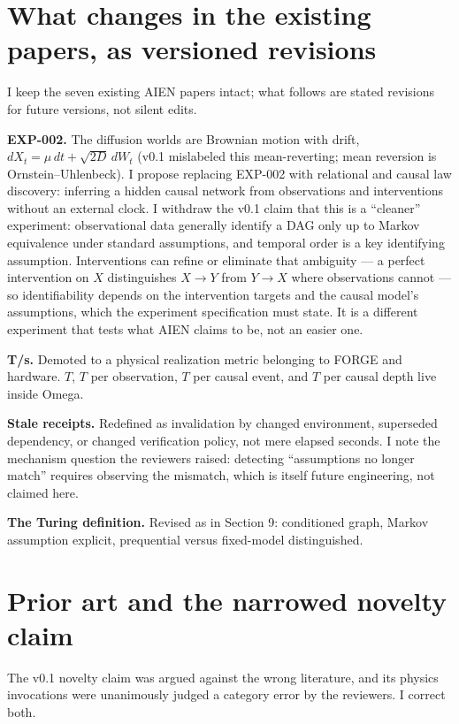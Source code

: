 \documentclass[11pt]{article}
\begin{document}
\section{What changes in the existing papers, as versioned revisions}

I keep the seven existing AIEN papers intact; what follows are stated revisions for future versions, not silent edits.

\textbf{EXP-002.} The diffusion worlds are Brownian motion with drift, $dX_t = \mu\,dt + \sqrt{2D}\,dW_t$ (v0.1 mislabeled this mean-reverting; mean reversion is Ornstein--Uhlenbeck). I propose replacing EXP-002 with relational and causal law discovery: inferring a hidden causal network from observations and interventions without an external clock. I withdraw the v0.1 claim that this is a ``cleaner'' experiment: observational data generally identify a DAG only up to Markov equivalence under standard assumptions, and temporal order is a key identifying assumption. Interventions can refine or eliminate that ambiguity --- a perfect intervention on $X$ distinguishes $X \to Y$ from $Y \to X$ where observations cannot --- so identifiability depends on the intervention targets and the causal model's assumptions, which the experiment specification must state. It is a different experiment that tests what AIEN claims to be, not an easier one.

\textbf{T/s.} Demoted to a physical realization metric belonging to FORGE and hardware. $T$, $T$ per observation, $T$ per causal event, and $T$ per causal depth live inside Omega.

\textbf{Stale receipts.} Redefined as invalidation by changed environment, superseded dependency, or changed verification policy, not mere elapsed seconds. I note the mechanism question the reviewers raised: detecting ``assumptions no longer match'' requires observing the mismatch, which is itself future engineering, not claimed here.

\textbf{The Turing definition.} Revised as in Section 9: conditioned graph, Markov assumption explicit, prequential versus fixed-model distinguished.

\section{Prior art and the narrowed novelty claim}

The v0.1 novelty claim was argued against the wrong literature, and its physics invocations were unanimously judged a category error by the reviewers. I correct both.
\end{document}
